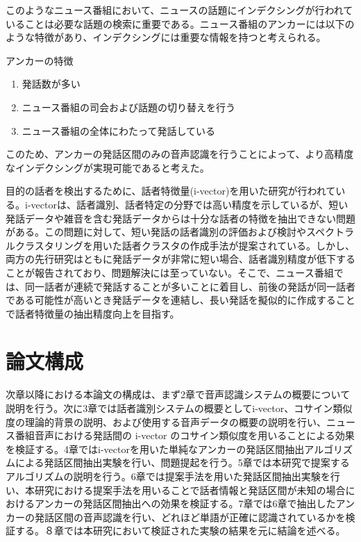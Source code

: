 このようなニュース番組において、ニュースの話題にインデクシングが行われていることは必要な話題の検索に重要である。ニュース番組のアンカーには以下のような特徴があり、インデクシングには重要な情報を持つと考えられる。\newline

アンカーの特徴
\begin{enumerate}
\item 発話数が多い
\item ニュース番組の司会および話題の切り替えを行う
\item ニュース番組の全体にわたって発話している
\end{enumerate}\par

このため、アンカーの発話区間のみの音声認識を行うことによって、より高精度なインデクシングが実現可能であると考えた。\par
目的の話者を検出するために、話者特徴量(i-vector)を用いた研究が行われている。i-vectorは、話者識別、話者特定の分野では高い精度を示しているが、短い発話データや雑音を含む発話データからは十分な話者の特徴を抽出できない問題がある。この問題に対して、短い発話の話者識別の評価および検討\cite{panaiv}やスペクトラルクラスタリングを用いた話者クラスタの作成手法\cite{spectroclus}が提案されている。しかし、両方の先行研究はともに発話データが非常に短い場合、話者識別精度が低下することが報告されており、問題解決には至っていない。そこで、ニュース番組では、同一話者が連続で発話することが多いことに着目し、前後の発話が同一話者である可能性が高いとき発話データを連結し、長い発話を擬似的に作成することで話者特徴量の抽出精度向上を目指す。

\section{論文構成}
次章以降における本論文の構成は、まず2章で音声認識システムの概要について説明を行う。次に3章では話者識別システムの概要としてi-vector、コサイン類似度の理論的背景の説明、および使用する音声データの概要の説明を行い、ニュース番組音声における発話間の i-vector のコサイン類似度を用いることによる効果を検証する。4章ではi-vectorを用いた単純なアンカーの発話区間抽出アルゴリズムによる発話区間抽出実験を行い、問題提起を行う。5章では本研究で提案するアルゴリズムの説明を行う。6章では提案手法を用いた発話区間抽出実験を行い、本研究における提案手法を用いることで話者情報と発話区間が未知の場合におけるアンカーの発話区間抽出への効果を検証する。7章では6章で抽出したアンカーの発話区間の音声認識を行い、どれほど単語が正確に認識されているかを検証する。８章では本研究において検証された実験の結果を元に結論を述べる。


